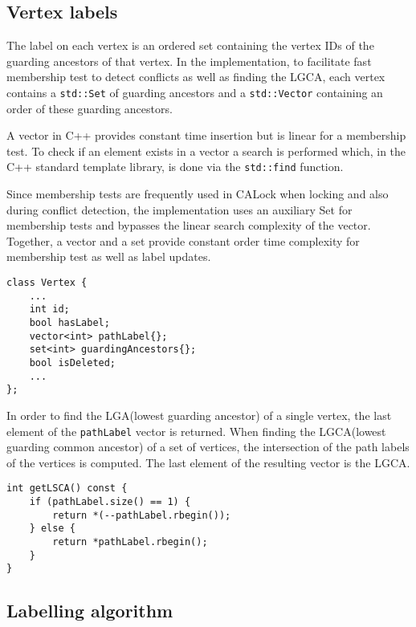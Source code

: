 \subsection{Vertex labels}

The label on each vertex is an ordered set containing the vertex IDs of the guarding ancestors of that vertex. In the implementation, to facilitate fast membership test to detect conflicts as well as finding the LGCA, each vertex contains a \texttt{std::Set} of guarding ancestors and a \texttt{std::Vector} containing an order of these guarding ancestors.  

A vector in C++ provides constant time insertion but is linear for a membership test. To check if an element exists in a vector a search is performed which, in the C++ standard template library, is done via the \texttt{std::find} function.

Since membership tests are frequently used in CALock when locking and also during conflict detection, the implementation uses an auxiliary Set for membership tests and bypasses the linear search complexity of the vector. Together, a vector and a set provide constant order time complexity for membership test as well as label updates.

\begin{lstlisting}[caption={Vertex class with CALock label fields}]
class Vertex {
    ...
    int id;
    bool hasLabel;
    vector<int> pathLabel{};
    set<int> guardingAncestors{};
    bool isDeleted;
    ...
};

\end{lstlisting}


In order to find the LGA(lowest guarding ancestor) of a single vertex, the last element of the \lstinline{pathLabel} vector is returned. When finding the LGCA(lowest guarding common ancestor) of a set of vertices, the intersection of the path labels of the vertices is computed. The last element of the resulting vector is the LGCA.

\begin{lstlisting}[caption={Finding LGCA using path label}]
int getLSCA() const {
    if (pathLabel.size() == 1) {
        return *(--pathLabel.rbegin());
    } else {
        return *pathLabel.rbegin();
    }
}
\end{lstlisting}


\subsection{Labelling algorithm}

